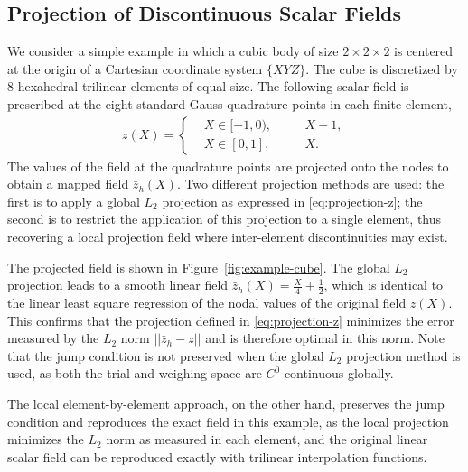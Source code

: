 \documentclass[12pt]{article}
\begin{document}
\subsection{Projection of Discontinuous Scalar Fields}

We consider a simple example in which a cubic body of size $2 \times 2
\times 2$ is centered at the origin of a Cartesian coordinate system
$\{XYZ\}$. The cube is discretized by 8 hexahedral trilinear elements
of equal size. The following scalar field is prescribed at the eight
standard Gauss quadrature points in each finite element,
\begin{align}
  z(X) =
  \left\{
    \begin{aligned}
      & X \in [-1, 0), & \quad & X + 1,
      \\
      & X \in [0, 1], & \quad & X.
    \end{aligned}
  \right. \label{eq:prescribed-scalar}
\end{align}
The values of the field at the quadrature points are projected onto
the nodes to obtain a mapped field $\bar{z}_{h}(X)$. Two different
projection methods are used: the first is to apply a global $L_2$
projection as expressed in \eqref{eq:projection-z}; the second is to
restrict the application of this projection to a single element, thus
recovering a local projection field where inter-element
discontinuities may exist.

The projected field is shown in Figure~\ref{fig:example-cube}. The global $L_2$
projection leads to a smooth linear field $\bar{z}_{h}(X) = \frac{X}{4} +
\frac{1}{2}$, which is identical to the linear least square regression of the
nodal values of the original field $z(X)$. This confirms that the projection
defined in \eqref{eq:projection-z} minimizes the error measured by the $L_2$
norm $||\bar{z}_{h} - z||$ and is therefore optimal in this norm. Note that the
jump condition is not preserved when the global $L_2$ projection method is used,
as both the trial and weighing space are $C^{0}$ continuous globally.
 
The local element-by-element approach, on the other hand, preserves the jump
condition and reproduces the exact field in this example, as the local
projection minimizes the $L_2$ norm as measured in each element, and the
original linear scalar field can be reproduced exactly with trilinear
interpolation functions.
\end{document}
